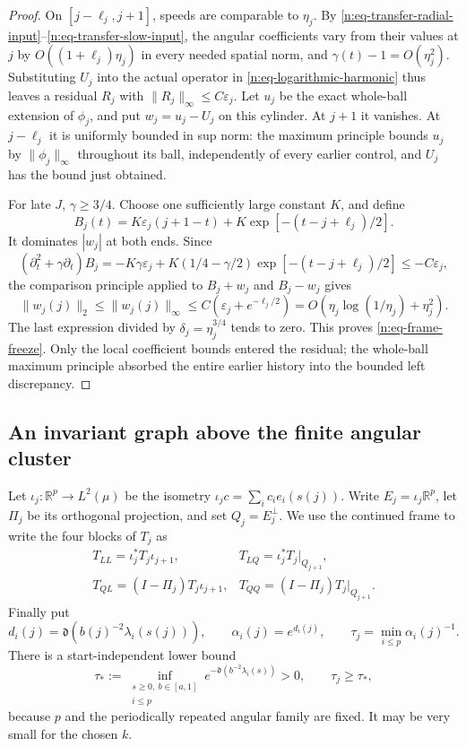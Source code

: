 \begin{proof}
On \([j-\ell_j,j+1]\), speeds are comparable to \(\eta_j\).  By
\eqref{n:eq-transfer-radial-input}--\eqref{n:eq-transfer-slow-input}, the
angular coefficients vary from their values at \(j\) by
\(O((1+\ell_j)\eta_j)\) in every needed spatial norm, and
\(\gamma(t)-1=O(\eta_j^2)\).  Substituting \(U_j\) into the actual operator
in \eqref{n:eq-logarithmic-harmonic} thus leaves a residual \(R_j\) with
\(\|R_j\|_\infty\leq C\varepsilon_j\).
Let \(u_j\) be the exact whole-ball extension of \(\phi_j\), and put
\(w_j=u_j-U_j\) on this cylinder.  At \(j+1\) it vanishes.  At \(j-\ell_j\)
it is uniformly bounded in sup norm: the maximum principle bounds \(u_j\)
by \(\|\phi_j\|_\infty\) throughout its ball, independently of every
earlier control, and \(U_j\) has the bound just obtained.

For late \(J\), \(\gamma\geq3/4\).  Choose one sufficiently large constant
\(K\), and define
\[
 B_j(t)=K\varepsilon_j(j+1-t)
       +K\exp[-(t-j+\ell_j)/2].
\]
It dominates \(|w_j|\) at both ends.  Since
\[
 (\partial_t^2+\gamma\partial_t)B_j
 =-K\gamma\varepsilon_j+
   K(1/4-\gamma/2)\exp[-(t-j+\ell_j)/2]
 \leq-C\varepsilon_j,
\]
the comparison principle applied to \(B_j+w_j\) and \(B_j-w_j\)
\cite[Theorem~3.3, p.~33]{GilbargTrudinger} gives
\[
 \|w_j(j)\|_2\leq\|w_j(j)\|_\infty
 \leq C(\varepsilon_j+e^{-\ell_j/2})
 =O\left(\eta_j\log(1/\eta_j)+\eta_j^2\right).
\]
The last expression divided by \(\delta_j=\eta_j^{3/4}\) tends to zero.
This proves \eqref{n:eq-frame-freeze}.  Only the local coefficient bounds
entered the residual; the whole-ball maximum principle absorbed the entire
earlier history into the bounded left discrepancy.
\end{proof}

\subsection{An invariant graph above the finite angular cluster}

Let \(\iota_j:\mathbb R^p\to L^2(\mu)\) be the isometry
\(\iota_jc=\sum_i c_i e_i(s(j))\).  Write \(E_j=\iota_j\mathbb R^p\),
let \(\Pi_j\) be its orthogonal projection, and set \(Q_j=E_j^\perp\).
We use the continued frame to write the four blocks of \(T_j\) as
\[
 \begin{array}{ll}
 T_{LL}=\iota_j^*T_j\iota_{j+1},&
 T_{LQ}=\iota_j^*T_j|_{Q_{j+1}},\\
 T_{QL}=(I-\Pi_j)T_j\iota_{j+1},&
 T_{QQ}=(I-\Pi_j)T_j|_{Q_{j+1}} .
 \end{array}
\]
Finally put
\[
 d_i(j)=\mathfrak d(b(j)^{-2}\lambda_i(s(j))),\qquad
 \alpha_i(j)=e^{d_i(j)},\qquad
 \tau_j=\min_{i\leq p}\alpha_i(j)^{-1}.
\]
There is a start-independent lower bound
\[
 \tau_*:=
 \inf_{\substack{s\geq0,\ b\in[a,1]\\ i\leq p}}
       e^{-\mathfrak d(b^{-2}\lambda_i(s))}>0,\qquad \tau_j\geq\tau_*,
\]
because \(p\) and the periodically repeated angular family are fixed.
It may be very small for the chosen \(k\).

